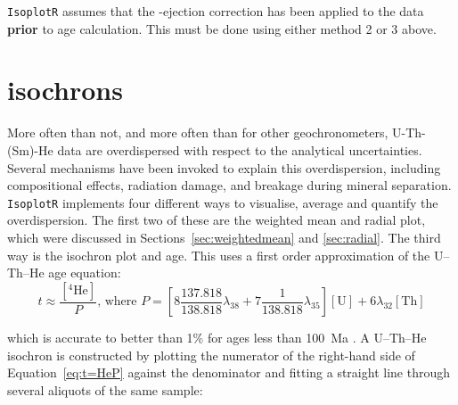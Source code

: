 \begin{refsection}
\texttt{IsoplotR} assumes that the \textalpha-ejection correction has
been applied to the data \textbf{prior} to age calculation. This must
be done using either method 2 or 3 above.

\section{isochrons}

More often than not, and more often than for other geochronometers,
U-Th-(Sm)-He data are overdispersed with respect to the analytical
uncertainties. Several mechanisms have been invoked to explain this
overdispersion, including compositional effects, radiation damage, and
breakage during mineral separation.\\

\texttt{IsoplotR} implements four different ways to visualise, average
and quantify the overdispersion.  The first two of these are the
weighted mean and radial plot, which were discussed in
Sections~\ref{sec:weightedmean} and \ref{sec:radial}. The third way is
the isochron plot and age. This uses a first order approximation of
the U--Th--He age equation:
\begin{equation}
  t \approx \frac{\left[{}^{4}\mbox{He}\right]}{P} \mbox{,~where~} P =
  \left[8 \frac{137.818}{138.818} \lambda_{38} + 7 \frac{1}{138.818}
    \lambda_{35} \right] [\mbox{U}] + 6 \lambda_{32} [\mbox{Th}]
    \label{eq:t=HeP}
\end{equation}

\noindent which is accurate to better than 1\% for ages less than
100~Ma \citep{vermeesch2008a}. A U--Th--He isochron is constructed by
plotting the numerator of the right-hand side of
Equation~\ref{eq:t=HeP} against the denominator and fitting a straight
line through several aliquots of the same sample:\\


\end{refsection}
